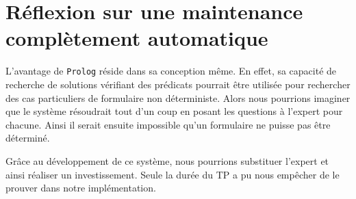 \section{Réflexion sur une maintenance complètement automatique}

L'avantage de \texttt{Prolog} réside dans sa conception même. En effet, sa capacité de recherche de solutions vérifiant des prédicats
pourrait être utilisée pour rechercher des cas particuliers de formulaire non déterministe. Alors nous pourrions imaginer que le
système résoudrait tout d'un coup en posant les questions à l'expert pour chacune. Ainsi il serait ensuite impossible qu'un
formulaire ne puisse pas être déterminé.

Grâce au développement de ce système, nous pourrions substituer l'expert et ainsi réaliser un investissement. Seule la durée du TP a pu nous empêcher de le prouver dans notre
implémentation.

